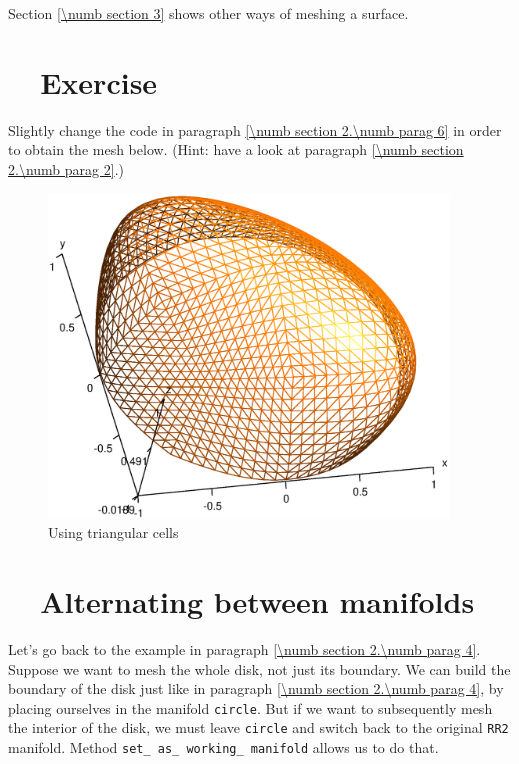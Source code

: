 Section \ref{\numb section 3} shows other ways of meshing a surface.


\section{~~Exercise}\label{\numb section 2.\numb parag 7}

Slightly change the code in paragraph \ref{\numb section 2.\numb parag 6}
in order to obtain the mesh below.
(Hint: have a look at paragraph \ref{\numb section 2.\numb parag 2}.)

\begin{figure}[ht] \centering
  \includegraphics[width=106mm]{hemisphere-1}
  \caption{Using triangular cells}
  \label{\numb section 2.\numb fig 7}
\end{figure}


\section{~~Alternating between manifolds}\label{\numb section 2.\numb parag 8}

Let's go back to the example in paragraph \ref{\numb section 2.\numb parag 4}.
Suppose we want to mesh the whole disk, not just its boundary.
We can build the boundary of the disk just like in paragraph
\ref{\numb section 2.\numb parag 4}, by placing ourselves in the manifold {\small\tt circle}.
But if we want to subsequently mesh the interior of the disk, we must leave {\small\tt circle}
and switch back to the original {\small\tt RR2} manifold.
Method {\small\tt set\_\,as\_\,working\_\,manifold} allows us to do that.

